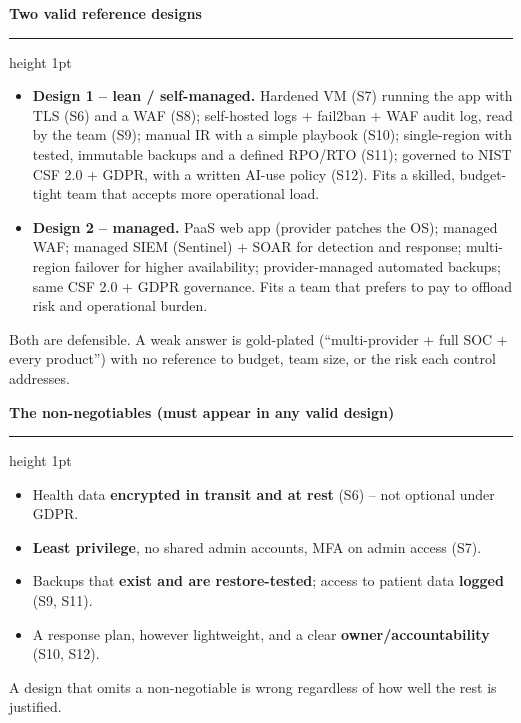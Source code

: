 \documentclass[11pt]{article}
\newcommand{\wbsection}[1]{\par\vspace{11pt}\noindent
  {\large\bfseries\color{kred}#1}\par\vspace{2pt}
  {\color{kred!35}\hrule height 1pt}\par\vspace{6pt}}
\renewcommand{\emph}[1]{\textup{#1}}
\begin{document}
\wbsection{Two valid reference designs}
\begin{itemize}
\item \textbf{Design 1 -- lean / self-managed.} Hardened VM (S7) running the app with TLS (S6) and a WAF
      (S8); self-hosted logs + fail2ban + WAF audit log, read by the team (S9); manual IR with a simple
      playbook (S10); single-region with tested, immutable backups and a defined RPO/RTO (S11); governed
      to NIST CSF 2.0 + GDPR, with a written AI-use policy (S12). \emph{Fits a skilled, budget-tight team
      that accepts more operational load.}
\item \textbf{Design 2 -- managed.} PaaS web app (provider patches the OS); managed WAF; managed SIEM
      (Sentinel) + SOAR for detection and response; multi-region failover for higher availability;
      provider-managed automated backups; same CSF 2.0 + GDPR governance. \emph{Fits a team that prefers
      to pay to offload risk and operational burden.}
\end{itemize}
Both are defensible. A weak answer is gold-plated (``multi-provider + full SOC + every product'') with no
reference to budget, team size, or the risk each control addresses.

\wbsection{The non-negotiables (must appear in any valid design)}
\begin{itemize}
\item Health data \textbf{encrypted in transit and at rest} (S6) -- not optional under GDPR.
\item \textbf{Least privilege}, no shared admin accounts, MFA on admin access (S7).
\item Backups that \textbf{exist and are restore-tested}; access to patient data \textbf{logged} (S9,
      S11).
\item A response plan, however lightweight, and a clear \textbf{owner/accountability} (S10, S12).
\end{itemize}
A design that omits a non-negotiable is wrong regardless of how well the rest is justified.
\end{document}
